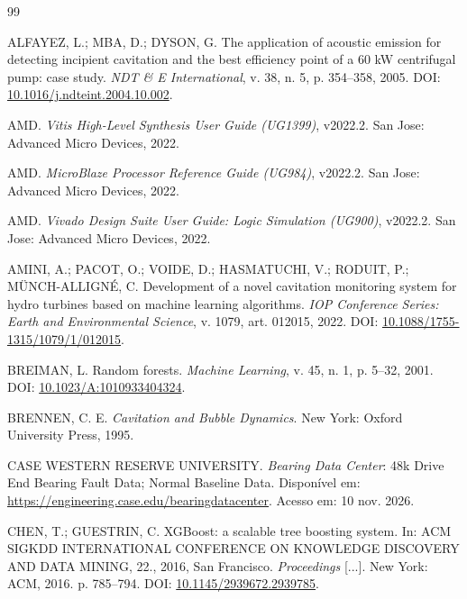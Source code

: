 \documentclass[12pt]{article}
\begin{document}
{\small
\begin{thebibliography}{99}
\setlength{\itemsep}{1pt}

	ALFAYEZ, L.; MBA, D.; DYSON, G.
	\newblock The application of acoustic emission for detecting incipient cavitation and the best efficiency point of a 60 kW centrifugal pump: case study.
	\newblock \emph{NDT \& E International}, v. 38, n. 5, p. 354--358, 2005.
	\newblock DOI: \href{https://doi.org/10.1016/j.ndteint.2004.10.002}{10.1016/j.ndteint.2004.10.002}.

	AMD.
	\newblock \emph{Vitis High-Level Synthesis User Guide (UG1399)}, v2022.2.
	\newblock San Jose: Advanced Micro Devices, 2022.

	AMD.
	\newblock \emph{MicroBlaze Processor Reference Guide (UG984)}, v2022.2.
	\newblock San Jose: Advanced Micro Devices, 2022.

	AMD.
	\newblock \emph{Vivado Design Suite User Guide: Logic Simulation (UG900)}, v2022.2.
	\newblock San Jose: Advanced Micro Devices, 2022.

	AMINI, A.; PACOT, O.; VOIDE, D.; HASMATUCHI, V.; RODUIT, P.; MÜNCH-ALLIGNÉ, C.
	\newblock Development of a novel cavitation monitoring system for hydro turbines based on machine learning algorithms.
	\newblock \emph{IOP Conference Series: Earth and Environmental Science}, v. 1079, art. 012015, 2022.
	\newblock DOI: \href{https://doi.org/10.1088/1755-1315/1079/1/012015}{10.1088/1755-1315/1079/1/012015}.

	BREIMAN, L.
	\newblock Random forests.
	\newblock \emph{Machine Learning}, v. 45, n. 1, p. 5--32, 2001.
	\newblock DOI: \href{https://doi.org/10.1023/A:1010933404324}{10.1023/A:1010933404324}.

	BRENNEN, C. E.
	\newblock \emph{Cavitation and Bubble Dynamics}.
	\newblock New York: Oxford University Press, 1995.

	CASE WESTERN RESERVE UNIVERSITY.
	\newblock \emph{Bearing Data Center}: 48k Drive End Bearing Fault Data; Normal Baseline Data.
	\newblock Disponível em: \url{https://engineering.case.edu/bearingdatacenter}. Acesso em: 10 nov. 2026.

	CHEN, T.; GUESTRIN, C.
	\newblock XGBoost: a scalable tree boosting system.
	\newblock In: ACM SIGKDD INTERNATIONAL CONFERENCE ON KNOWLEDGE DISCOVERY AND DATA MINING, 22., 2016, San Francisco. \emph{Proceedings} [...]. New York: ACM, 2016. p. 785--794.
	\newblock DOI: \href{https://doi.org/10.1145/2939672.2939785}{10.1145/2939672.2939785}.


\end{thebibliography}}
\end{document}
